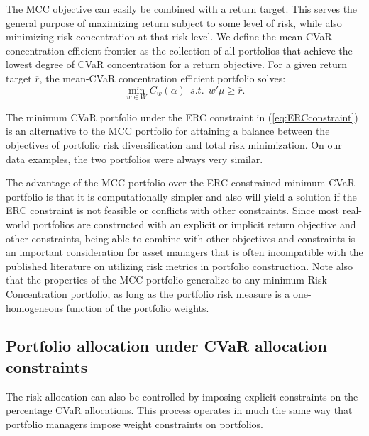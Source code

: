 \documentclass[12pt,a4paper]{article}
\begin{document}




	The MCC objective can easily be combined with a return target. This serves the general purpose of maximizing return subject to some level of risk, while also minimizing risk concentration at that risk level. We define the mean-CVaR concentration efficient frontier as the collection of all portfolios that achieve the lowest degree of CVaR concentration for a return objective. For a given return target $\overline{r}$,  the mean-CVaR concentration efficient portfolio solves:
\begin{equation} \min_{w \in W} C_w(\alpha)  \ \ s.t. \ \ w'\mu \geq \overline{r}. \label{eq:CVarConc_frontier}\end{equation}


The minimum CVaR portfolio under the ERC constraint in (\ref{eq:ERCconstraint}) is an alternative to the MCC portfolio for attaining a balance between the objectives of portfolio risk diversification and total risk minimization.  On our data examples, the two portfolios were always very similar.


The advantage of the MCC portfolio over the ERC constrained minimum CVaR portfolio is that it is computationally simpler and also will yield a solution if the ERC constraint is not feasible or conflicts with other constraints. Since most real-world portfolios are constructed with an explicit or implicit return objective and other constraints, being able to combine with other objectives and constraints is an important consideration for asset managers that is often incompatible with the published literature on utilizing risk metrics in portfolio construction. Note also that the properties of the MCC portfolio generalize to any minimum Risk Concentration portfolio, as long as the portfolio risk measure is a one-homogeneous function of the portfolio weights.

\subsection{Portfolio allocation under CVaR allocation constraints}

The risk allocation can also be controlled by imposing explicit constraints on the percentage CVaR allocations.  This process operates in much the same way that portfolio managers impose weight constraints on portfolios.
\end{document}
